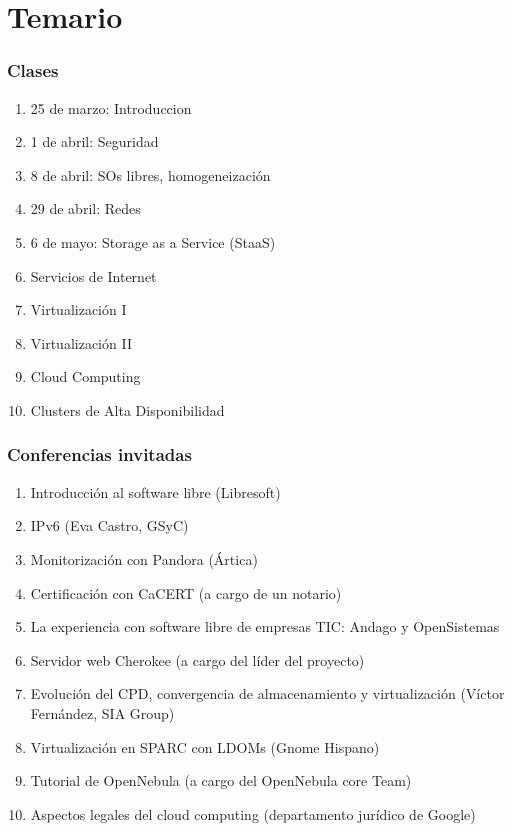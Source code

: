\documentclass{beamer}
\begin{document}
\section{Temario}
\begin{frame}
\frametitle{Clases}
\begin{enumerate}
\item 25 de marzo: Introduccion
\item 1 de abril: Seguridad
\item 8 de abril: SOs libres, homogeneización
\item 29 de abril: Redes
\item 6 de mayo: Storage as a Service (StaaS)
\item Servicios de Internet
\item Virtualización I
\item Virtualización II
\item Cloud Computing
\item Clusters de Alta Disponibilidad
\end{enumerate}
\end{frame}


\begin{frame}
\frametitle{Conferencias invitadas}

\begin{enumerate}
\item Introducción al software libre (Libresoft)
\item IPv6 (Eva Castro, GSyC)
\item Monitorización con Pandora (Ártica)
\item Certificación con CaCERT (a cargo de un notario)
\item La experiencia con software libre de empresas TIC: Andago y OpenSistemas
\item Servidor web Cherokee (a cargo del líder del proyecto)
\item Evolución del CPD, convergencia de almacenamiento y virtualización (Víctor Fernández, SIA Group)
\item Virtualización en SPARC con LDOMs (Gnome Hispano)
\item Tutorial de OpenNebula (a cargo del OpenNebula core Team)
\item Aspectos legales del cloud computing (departamento jurídico de Google)
\end{enumerate}

\end{frame}
\end{document}
